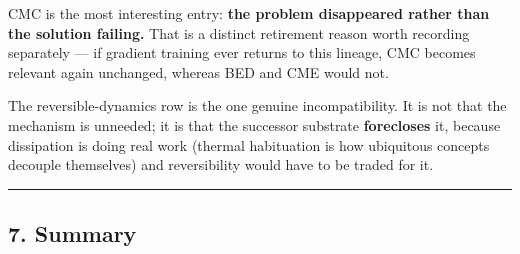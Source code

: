 \documentclass[
  11pt,
  a4paper,
]{article}
\begin{document}
CMC is the most interesting entry: \textbf{the problem disappeared
rather than the solution failing.} That is a distinct retirement reason
worth recording separately --- if gradient training ever returns to this
lineage, CMC becomes relevant again unchanged, whereas BED and CME would
not.

The reversible-dynamics row is the one genuine incompatibility. It is
not that the mechanism is unneeded; it is that the successor substrate
\textbf{forecloses} it, because dissipation is doing real work (thermal
habituation is how ubiquitous concepts decouple themselves) and
reversibility would have to be traded for it.

\begin{center}\rule{0.5\linewidth}{0.5pt}\end{center}

\subsection{7. Summary}\label{summary}
\end{document}
